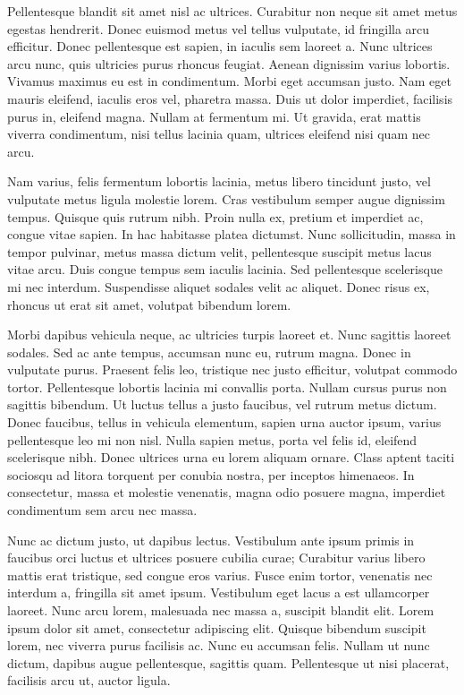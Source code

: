 Pellentesque blandit sit amet nisl ac ultrices. Curabitur non neque sit amet metus egestas hendrerit. Donec euismod metus vel tellus vulputate, id fringilla arcu efficitur. Donec pellentesque est sapien, in iaculis sem laoreet a. Nunc ultrices arcu nunc, quis ultricies purus rhoncus feugiat. Aenean dignissim varius lobortis. Vivamus maximus eu est in condimentum. Morbi eget accumsan justo. Nam eget mauris eleifend, iaculis eros vel, pharetra massa. Duis ut dolor imperdiet, facilisis purus in, eleifend magna. Nullam at fermentum mi. Ut gravida, erat mattis viverra condimentum, nisi tellus lacinia quam, ultrices eleifend nisi quam nec arcu.

Nam varius, felis fermentum lobortis lacinia, metus libero tincidunt justo, vel vulputate metus ligula molestie lorem. Cras vestibulum semper augue dignissim tempus. Quisque quis rutrum nibh. Proin nulla ex, pretium et imperdiet ac, congue vitae sapien. In hac habitasse platea dictumst. Nunc sollicitudin, massa in tempor pulvinar, metus massa dictum velit, pellentesque suscipit metus lacus vitae arcu. Duis congue tempus sem iaculis lacinia. Sed pellentesque scelerisque mi nec interdum. Suspendisse aliquet sodales velit ac aliquet. Donec risus ex, rhoncus ut erat sit amet, volutpat bibendum lorem.

Morbi dapibus vehicula neque, ac ultricies turpis laoreet et. Nunc sagittis laoreet sodales. Sed ac ante tempus, accumsan nunc eu, rutrum magna. Donec in vulputate purus. Praesent felis leo, tristique nec justo efficitur, volutpat commodo tortor. Pellentesque lobortis lacinia mi convallis porta. Nullam cursus purus non sagittis bibendum. Ut luctus tellus a justo faucibus, vel rutrum metus dictum. Donec faucibus, tellus in vehicula elementum, sapien urna auctor ipsum, varius pellentesque leo mi non nisl. Nulla sapien metus, porta vel felis id, eleifend scelerisque nibh. Donec ultrices urna eu lorem aliquam ornare. Class aptent taciti sociosqu ad litora torquent per conubia nostra, per inceptos himenaeos. In consectetur, massa et molestie venenatis, magna odio posuere magna, imperdiet condimentum sem arcu nec massa.

Nunc ac dictum justo, ut dapibus lectus. Vestibulum ante ipsum primis in faucibus orci luctus et ultrices posuere cubilia curae; Curabitur varius libero mattis erat tristique, sed congue eros varius. Fusce enim tortor, venenatis nec interdum a, fringilla sit amet ipsum. Vestibulum eget lacus a est ullamcorper laoreet. Nunc arcu lorem, malesuada nec massa a, suscipit blandit elit. Lorem ipsum dolor sit amet, consectetur adipiscing elit. Quisque bibendum suscipit lorem, nec viverra purus facilisis ac. Nunc eu accumsan felis. Nullam ut nunc dictum, dapibus augue pellentesque, sagittis quam. Pellentesque ut nisi placerat, facilisis arcu ut, auctor ligula.

